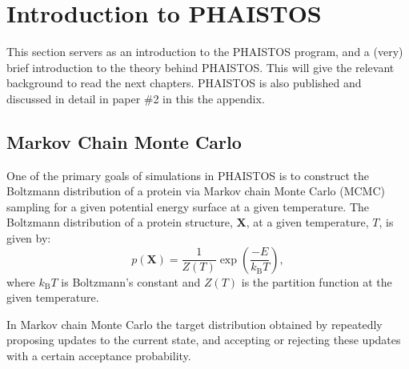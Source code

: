 \chapter{Introduction to PHAISTOS}

This section servers as an introduction to the PHAISTOS program, and a (very) brief introduction to the theory behind PHAISTOS\cite{Phaistos}. 
This will give the relevant background to read the next chapters.
PHAISTOS is also published and discussed in detail in paper \#2 in this the appendix.

\section{Markov Chain Monte Carlo}

One of the primary goals of simulations in PHAISTOS is to construct the Boltzmann distribution of a protein via Markov chain Monte Carlo (MCMC) sampling for a given potential energy surface at a given temperature.
The Boltzmann distribution of a protein structure, $\mathbf X$, at a given temperature, $T$, is given by:
\begin{equation}
    \label{eq:boltzmann}
    p(\mathbf X) = \frac{1}{Z(T)} \exp{\left( \frac{-E}{k_\mathrm{B}T}\right)},
\end{equation}
where $k_\mathrm{B}T$ is Boltzmann's constant and $Z(T)$ is the partition function at the given temperature.

In Markov chain Monte Carlo the target distribution obtained by repeatedly proposing updates to the current state, and accepting or rejecting these updates with a certain acceptance probability.

